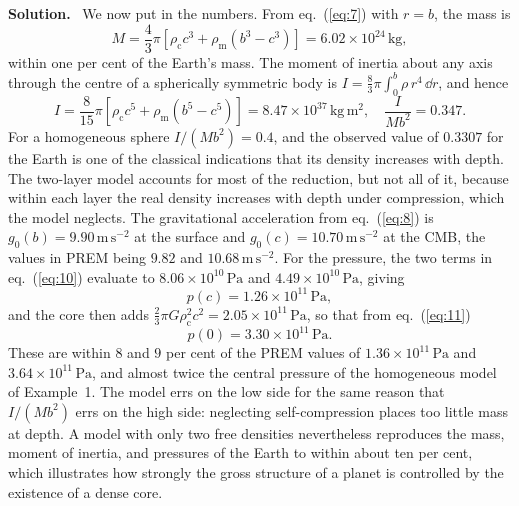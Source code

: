 \documentclass[a4paper,12pt]{paper}
\newenvironment{solution}{\par\noindent\textbf{Solution.}\ }{\par\medskip}
\begin{document}
\begin{solution}
We now put in the numbers. From eq.~(\ref{eq:7}) with $r=b$, the mass is
\begin{equation}
M=\frac{4}{3}\pi\left[\rho_{\mathrm{c}}c^{3}+\rho_{\mathrm{m}}(b^{3}-c^{3})\right]=6.02\times10^{24}\,\mathrm{kg},
\label{eq:12}
\end{equation}
within one per cent of the Earth's mass. The moment of inertia about any axis through the centre of
a spherically symmetric body is $I=\frac{8}{3}\pi\int_{0}^{b}\rho\,r^{4}\,\dd r$, and hence
\begin{equation}
I=\frac{8}{15}\pi\left[\rho_{\mathrm{c}}c^{5}+\rho_{\mathrm{m}}(b^{5}-c^{5})\right]=8.47\times10^{37}\,\mathrm{kg\,m^{2}},
\quad\frac{I}{Mb^{2}}=0.347.
\label{eq:13}
\end{equation}
For a homogeneous sphere $I/(Mb^{2})=0.4$, and the observed value of $0.3307$ for the Earth is
one of the classical indications that its density increases with depth. The two-layer model
accounts for most of the reduction, but not all of it, because within each layer the real
density increases with depth under compression, which the model neglects. The gravitational
acceleration from eq.~(\ref{eq:8}) is $g_{0}(b)=9.90\,\mathrm{m\,s^{-2}}$ at the surface and
$g_{0}(c)=10.70\,\mathrm{m\,s^{-2}}$ at the CMB, the values in PREM being $9.82$ and
$10.68\,\mathrm{m\,s^{-2}}$. For the pressure, the two terms in eq.~(\ref{eq:10}) evaluate to
$8.06\times10^{10}\,\mathrm{Pa}$ and $4.49\times10^{10}\,\mathrm{Pa}$, giving
\begin{equation}
p(c)=1.26\times10^{11}\,\mathrm{Pa},
\label{eq:14}
\end{equation}
and the core then adds $\frac{2}{3}\pi G\rho_{\mathrm{c}}^{2}c^{2}=2.05\times10^{11}\,\mathrm{Pa}$,
so that from eq.~(\ref{eq:11})
\begin{equation}
p(0)=3.30\times10^{11}\,\mathrm{Pa}.
\label{eq:15}
\end{equation}
These are within $8$ and $9$ per cent of the PREM values of $1.36\times10^{11}\,\mathrm{Pa}$ and
$3.64\times10^{11}\,\mathrm{Pa}$, and almost twice the central pressure of the homogeneous model
of Example~1. The model errs on the low side for the same reason that $I/(Mb^{2})$ errs on the
high side: neglecting self-compression places too little mass at depth. A model with only two free
densities nevertheless reproduces the mass, moment of inertia, and pressures of the Earth to within
about ten per cent, which illustrates how strongly the gross structure of a planet is controlled by
the existence of a dense core.
\end{solution}
\end{document}
